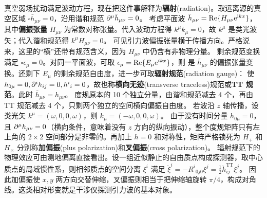 真空弱场扰动满足波动方程，现在把这件事解释为\textbf{辐射}(radiation)。取远离源的真空区域 $\square\bar h_{\mu\nu}=0$，沿用谐和规范 $\partial^\mu\bar h_{\mu\nu}=0$。
考虑平面波 $\bar h_{\mu\nu}=\Re\{H_{\mu\nu}\mathrm{e}^{\mathrm{i} kx}\}$，其中\textbf{偏振张量} $H_{\mu\nu}$ 为常数对称张量。代入波动方程得 $k^\mu k_\mu=0$，故 $k^\mu$ 是类光波矢；代入谐和规范得 $k^\mu H_{\mu\nu}=0$。
可见引力波偏振张量横于传播方向。严格说来，这里的“横”还带有规范含义，因为 $H_{\mu\nu}$ 中仍含有非物理分量。
剩余规范变换满足 $\square\epsilon_\mu=0$。对同一平面波，可取 $\epsilon_\mu=\Re\{E_\mu\mathrm{e}^{ikx}\}$，则
是 $\bar h_{\mu\nu}$ 的偏振张量变换。还剩下 $E_\mu$ 的剩余规范自由度，进一步可取\textbf{辐射规范}(radiation gauge)：
使 $h_{0\mu}=0,\partial^i h_{ij}=0,h^i{}_i=0$，故也称\textbf{横向无迹}(transverse traceless)规范或\textbf{TT 规范}。此时 $\bar h_{\mu\nu}=h_{\mu\nu}$。
度规原本的 10 个独立分量，由谐和规范减去 4 个，再由 TT 规范减去 4 个，只剩两个独立的空间横向偏振自由度。
若波沿 $z$ 轴传播，设类光矢 $k^\mu=(\omega,0,0,\omega)$，则 $k_\mu=(-\omega,0,0,\omega)$。
由于没有时间分量 $h_{0\mu} = 0$，且 $\partial^\mu h_{\mu\nu} = 0$（横向条件，意味着没有 $z$ 方向的纵向振动），整个度规矩阵只有左上角的 $2 \times 2$ 空间部分是非零的。再加上 $h=0$ 和对称性，矩阵严格锁死为
$H_+$ 和 $H_\times$ 分别称\textbf{加偏振}(plus polarization)和\textbf{叉偏振}(cross polarization)。
辐射规范下的物理效应可由测地偏离直接看出。设一组近似静止的自由质点构成探测器，取中心质点的局域惯性系，则相邻质点的空间分离 $\xi^i$ 满足 $\ddot\xi^i=-R^i{}_{0j0}\xi^j=\frac12\ddot h^{\mathrm{TT}}_{ij}\xi^j$。
因此加偏振使 $x,y$ 两方向交替伸缩，叉偏振则相当于把伸缩轴旋转 $\pi/4$，构成对角线。这类相对形变就是干涉仪探测引力波的基本对象。

